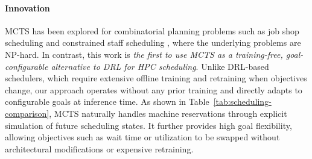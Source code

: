 \documentclass[conference]{IEEEtran}
\begin{document}
\paragraph{Innovation}
MCTS has been explored for combinatorial planning problems such as job shop scheduling \cite{jssp1, jssp2} and constrained staff scheduling \cite{staffsched}, where the underlying problems are NP-hard. 
In contrast, this work is \emph{the first to use MCTS as a training-free, goal-configurable alternative to DRL for HPC scheduling}. 
Unlike DRL-based schedulers, which require extensive offline training and retraining when objectives change, our approach operates without any prior training and directly adapts to configurable goals at inference time. 
As shown in Table~\ref{tab:scheduling-comparison}, MCTS naturally handles machine reservations through explicit simulation of future scheduling states. It further provides high goal flexibility, allowing objectives such as wait time or utilization to be swapped without architectural modifications or expensive retraining.




\end{document}
